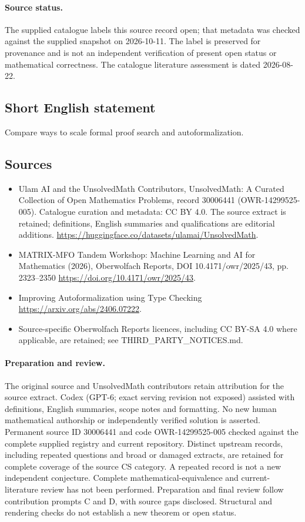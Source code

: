 \documentclass[11pt]{article}
\begin{document}
\paragraph{Source status.}
The supplied catalogue labels this source record open; that metadata was checked against the supplied snapshot on 2026-10-11. The label is preserved for provenance and is not an independent verification of present open status or mathematical correctness. The catalogue literature assessment is dated 2026-08-22.
\subsection{Short English statement}
Compare ways to scale formal proof search and autoformalization.
\subsection{Sources}
\begin{itemize}
\item[S1] Ulam AI and the UnsolvedMath Contributors, UnsolvedMath: A Curated Collection of Open Mathematics Problems, record 30006441 (OWR-14299525-005). Catalogue curation and metadata: CC BY 4.0. The source extract is retained; definitions, English summaries and qualifications are editorial additions.
\url{https://huggingface.co/datasets/ulamai/UnsolvedMath}.
\item[S2] MATRIX-MFO Tandem Workshop: Machine Learning and AI for Mathematics (2026), Oberwolfach Reports, DOI 10.4171/owr/2025/43, pp. 2323--2350
\url{https://doi.org/10.4171/owr/2025/43}.
\item[S3] Improving Autoformalization using Type Checking
\url{https://arxiv.org/abs/2406.07222}.
\item Source-specific Oberwolfach Reports licences, including CC BY-SA 4.0 where applicable, are retained; see THIRD\_PARTY\_NOTICES.md.
\end{itemize}
\paragraph{Preparation and review.}
The original source and UnsolvedMath contributors retain attribution for the source extract. Codex (GPT-6; exact serving revision not exposed) assisted with definitions, English summaries, scope notes and formatting. No new human mathematical authorship or independently verified solution is asserted. Permanent source ID 30006441 and code OWR-14299525-005 checked against the complete supplied registry and current repository. Distinct upstream records, including repeated questions and broad or damaged extracts, are retained for complete coverage of the source CS category. A repeated record is not a new independent conjecture. Complete mathematical-equivalence and current-literature review has not been performed. Preparation and final review follow contribution prompts C and D, with source gaps disclosed. Structural and rendering checks do not establish a new theorem or open status.
\label{end:30006441}
\end{document}
